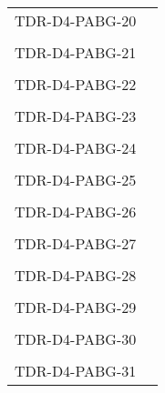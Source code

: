 \begin{longtable}{|p{2cm}|p{12cm}|@{}}
\\
\hline  
TDR-D4-PABG-20&
\begin{minipage}{12cm}
\end{minipage}\\
\\
\hline  
TDR-D4-PABG-21&
\begin{minipage}{12cm}
\end{minipage}\\
\\
\hline  
TDR-D4-PABG-22&
\begin{minipage}{12cm}
\end{minipage}\\
\\
\hline  
TDR-D4-PABG-23&
\begin{minipage}{12cm}
\end{minipage}\\
\\
\hline  
TDR-D4-PABG-24&
\begin{minipage}{12cm}
\end{minipage}\\
\\
\hline  
TDR-D4-PABG-25&
\begin{minipage}{12cm}
\end{minipage}\\
\\
\hline  
TDR-D4-PABG-26&
\begin{minipage}{12cm}
\end{minipage}\\
\\
\hline  
TDR-D4-PABG-27&
\begin{minipage}{12cm}
\end{minipage}\\
\\
\hline 
TDR-D4-PABG-28&
\begin{minipage}{12cm}
\end{minipage}\\
\\
\hline  
TDR-D4-PABG-29&
\begin{minipage}{12cm}
\end{minipage}\\
\\
\hline  
TDR-D4-PABG-30&
\begin{minipage}{12cm}
\end{minipage}\\
\\
\hline  
TDR-D4-PABG-31&
\begin{minipage}{12cm}

\end{minipage}
\end{longtable}

